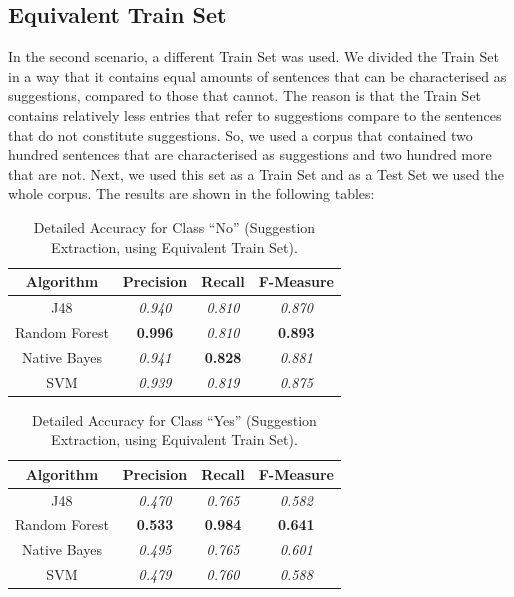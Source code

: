 \subsection{Equivalent Train Set}\label{422_ref}
In the second scenario, a different Train Set was used. We divided the Train Set in a way that it contains equal amounts of sentences that can be characterised as suggestions, compared to those that cannot. The reason is that the Train Set contains relatively less entries that refer to suggestions compare to the sentences that do not constitute suggestions. So, we used a corpus that contained two hundred sentences that are characterised as suggestions and two hundred more that are not. Next, we used this set as a Train Set and as a Test Set we used the whole corpus. The results are shown in the following tables:
\begin{table}[H]
\centering
\caption{Detailed Accuracy for Class “No” (Suggestion Extraction, using Equivalent Train Set).}
\label{49_table_rer}
\begin{tabular}{cccc}
\hline
{\bf Algorithm} & {\bf Precision} & {\bf Recall} & {\bf F-Measure} \\ \hline
J48             & {\it 0.940}      & {\it 0.810}   & {\it 0.870}      \\
Random Forest   & {\bf 0.996}     & {\it 0.810}   & {\bf 0.893}     \\
Native Bayes    & {\it 0.941}     & {\bf 0.828}  & {\it 0.881}     \\
SVM             & {\it 0.939}     & {\it 0.819}  & {\it 0.875}     \\ \hline
\end{tabular}
\end{table}

\begin{table}[H]
\centering
\caption{Detailed Accuracy for Class “Yes” (Suggestion Extraction, using Equivalent Train Set).}
\label{410_table_rer}
\begin{tabular}{cccc}
\hline
{\bf Algorithm} & {\bf Precision} & {\bf Recall} & {\bf F-Measure} \\ \hline
J48             & {\it 0.470}      & {\it 0.765}  & {\it 0.582}     \\
Random Forest   & {\bf 0.533}     & {\bf 0.984}  & {\bf 0.641}     \\
Native Bayes    & {\it 0.495}     & {\it 0.765}  & {\it 0.601}     \\
SVM             & {\it 0.479}     & {\it 0.760}   & {\it 0.588}     \\ \hline
\end{tabular}
\end{table}

